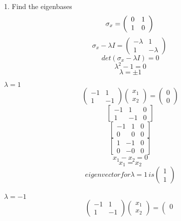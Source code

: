 \documentclass[12pt]{article}
\renewcommand{\>}{\rangle}
\newcommand{\<}{\langle}
\begin{document}
1. Find the eigenbases
\[
\sigma_x =
\left(
\begin{array}{cc}
0 & 1 \\
1 & 0
\end{array}
\right)
\\
\]
\[ \sigma_x - \lambda I = \left(
\begin{array}{cc}
- \lambda & 1 \\
1 & - \lambda
\end{array} \right) \
\]\[
det ( \sigma_x - \lambda I ) = 0
\]
\[\lambda^{2} - 1 = 0 \]
\[\lambda = \pm 1 \]
\begin{multicols}{2}
$\lambda = 1 $
\\
\[ \left(
\begin{array}{cc}
-1 & 1 \\
1 & -1
\end{array}
\right)
\left( 
\begin{array}{cc}
x_1 \\
 x_2 
\end{array}
\right) 
= \left( 
\begin{array}{cc}
0 \\
0 
\end{array}
\right) 
\]
\[
\left[ 
\begin{array}{ccc}
-1 & 1 & 0 \\
1 & -1  & 0
\end{array}
\right]
\]
\[
\left[ 
\begin{array}{ccc}
-1 & 1 & 0 \\
0 & 0  & 0
\end{array}
\right]
\]
\[
\left[ 
\begin{array}{ccc}
1 & -1 & 0 \\
0 & -0  & 0
\end{array}
\right]
\]
\[x_1 - x_2 = 0\]
\[ x_1 = x_2\]
\[ eigenvector for \lambda = 1\,  is \left( 
\begin{array}{cc}
1 \\
 1 
\end{array}
\right) 
\]
\columnbreak
\\
$\lambda = -1 $
\[ \left(
\begin{array}{cc}
-1 & 1 \\
1 & -1
\end{array}
\right)
\left( 
\begin{array}{cc}
x_1 \\
 x_2 
\end{array}
\right) 
= \left( 
\begin{array}{cc}
0 \\

\end{array}\]
\end{multicols}
\end{document}
